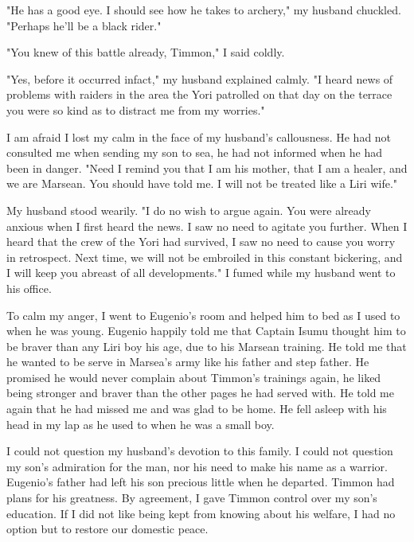 \documentclass{article}
\begin{document}
"He has a good eye. I should see how he takes to archery," my husband chuckled. "Perhaps he'll be a black rider."

"You knew of this battle already, Timmon," I said coldly.

"Yes, before it occurred infact," my husband explained calmly. "I heard news of problems with raiders in the area the Yori patrolled on that day on the terrace you were so kind as to distract me from my worries."

I am afraid I lost my calm in the face of my husband's callousness. He had not consulted me when sending my son to sea, he had not informed when he had been in danger. "Need I remind you that I am his mother, that I am a healer, and we are Marsean. You should have told me. I will not be treated like a Liri wife."

My husband stood wearily. "I do no wish to argue again. You were already anxious when I first heard the news. I saw no need to agitate you further. When I heard that the crew of the Yori had survived, I saw no need to cause you worry in retrospect. Next time, we will not be embroiled in this constant bickering, and I will keep you abreast of all developments." I fumed while my husband went to his office.

To calm my anger, I went to Eugenio's room and helped him to bed as I used to when he was young. Eugenio happily told me that Captain Isumu thought him to be braver than any Liri boy his age, due to his Marsean training. He told me that he wanted to be serve in Marsea's army like his father and step father. He promised he would never complain about Timmon's trainings again, he liked being stronger and braver than the other pages he had served with. He told me again that he had missed me and was glad to be home. He fell asleep with his head in my lap as he used to when he was a small boy. 

I could not question my husband's devotion to this family. I could not question my son's admiration for the man, nor his need to make his name as a warrior. Eugenio's father had left his son precious little when he departed. Timmon had plans for his greatness. By agreement, I gave Timmon control over my son's education. If I did not like being kept from knowing about his welfare, I had no option but to restore our domestic peace.

\vspace{.5cm} 

\end{document}
